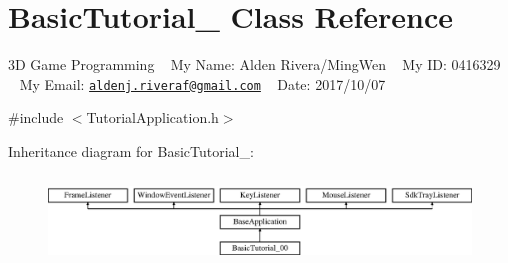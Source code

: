 \hypertarget{class_basic_tutorial__00}{}\section{Basic\+Tutorial\+\_ Class Reference}
\label{class_basic_tutorial__00}


3D Game Programming ~\newline
My Name\+: Alden Rivera/\+Ming\+Wen ~\newline
My ID\+: 0416329 ~\newline
My Email\+: \href{mailto:aldenj.riveraf@gmail.com}{\tt aldenj.\+riveraf@gmail.\+com} ~\newline
 Date\+: 2017/10/07  




{\ttfamily \#include $<$Tutorial\+Application.\+h$>$}

Inheritance diagram for Basic\+Tutorial\+\_\+:\begin{figure}[H]
\begin{center}
\leavevmode
\includegraphics[height=2.382979cm]{class_basic_tutorial__00}
\end{center}
\end{figure}
